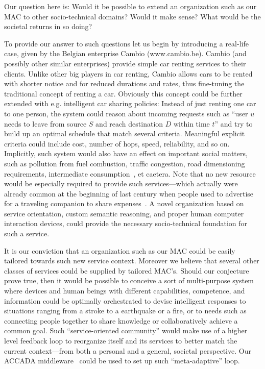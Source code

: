 \documentclass{llncs}
\begin{document}
Our question here is: Would it be possible to extend an organization such as our MAC to other
socio-technical domains? Would it make sense? What would be the societal returns in so doing?

To provide our answer to such questions let us begin by introducing a real-life case, given by the
Belgian enterprise Cambio (www.cambio.be). Cambio (and possibly other similar enterprises) provide simple
car renting services to their clients. Unlike other big players in car renting, Cambio allows cars to be
rented with shorter notice and for reduced durations and rates, thus fine-tuning the traditional concept
of renting a car. Obviously this concept could be further extended with e.g. intelligent car sharing
policies: Instead of just renting one car to one person, the system could reason about incoming requests
such as ``user $u$ needs to leave from source $S$ and reach destination $D$ within time $t$'' and try to
build up an optimal schedule that match several criteria. Meaningful explicit criteria could include
cost, number of hops, speed, reliability, and so on. Implicitly, such system would also have an effect on
important social matters, such as pollution from fuel combustion, traffic congestion, road dimensioning
requirements, intermediate consumption~\cite{ic}, et caetera. Note that no new resource would be
especially required to provide such services---which actually were already common at the beginning of last
century when people used to advertise for a traveling companion to share expenses~\cite{GBB}. A novel
organization based on service orientation, custom semantic reasoning, and proper human computer
interaction devices, could provide the necessary socio-technical foundation for such a service.

It is our conviction that an organization such as our MAC could be easily tailored towards such new
service context. Moreover we believe that several other classes of services could be supplied by tailored
MAC's. Should our conjecture prove true, then it would be possible to conceive a sort of multi-purpose
system where devices and human beings with different capabilities, competence, and information could be
optimally orchestrated to devise intelligent responses to situations ranging from a stroke to a
earthquake or a fire, or to needs such as connecting people together to share knowledge or
collaboratively achieve a common goal. Such ``service-oriented community''
would make use of a higher level feedback loop to reorganize itself and its services to
better match the current context---from both a personal and a general, societal perspective. Our ACCADA
middleware~\cite{GuD10+} could be used to set up such ``meta-adaptive'' loop.
\end{document}

